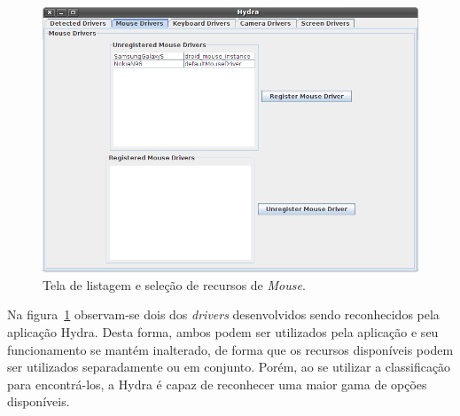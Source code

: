 \begin{figure}[ht]
	\center
	\includegraphics[scale=0.5]{imagens/printscreenMouseDrivers}
	\caption{Tela de listagem e seleção de recursos de \emph{Mouse}.}
	\label{fig:printscreen_hydra}
\end{figure}

Na figura~\ref{fig:printscreen_hydra} observam-se dois dos \emph{drivers} desenvolvidos sendo reconhecidos pela aplicação Hydra. Desta forma, ambos podem ser utilizados pela aplicação e seu funcionamento se mantém inalterado, de forma que os recursos disponíveis podem ser utilizados separadamente ou em conjunto. Porém, ao se utilizar a classificação para encontrá-los, a Hydra é capaz de reconhecer uma maior gama de opções disponíveis.
